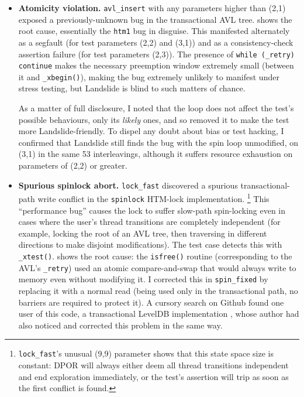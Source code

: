 \begin{itemize}
	\item
	{\bf Atomicity violation.}
	{\tt avl\_insert} with any parameters higher than (2,1)
	exposed a previously-unknown bug in the transactional AVL tree.
	 shows the root cause, essentially the {\tt htm1} bug in disguise.
	This manifested
	alternately
	as a segfault (for test parameters (2,2) and (3,1))
	and
	as a consistency-check assertion failure (for test parameters (2,3)).
	The presence of {\tt while (\_retry) continue} makes the necessary preemption window extremely small
	(between it and {\tt \_xbegin()}),
	making the bug extremely unlikely to manifest under stress testing,
	but Landslide is blind to such matters of chance.

	As a matter of full disclosure,
	I noted that the loop does not affect the test's possible behaviours,
	only its {\em likely} ones,
	and so removed it to make the test more Landslide-friendly.
	To dispel any doubt about bias or test hacking,
	I confirmed that Landslide still finds the bug with the spin loop unmodified,
	on (3,1) in the same 53 interleavings,
	although it suffers resource exhaustion
	on parameters of (2,2) or greater.
	\item
	{\bf Spurious spinlock abort.}
	{\tt lock\_fast} discovered a spurious transactional-path write conflict
	in the {\tt spinlock} HTM-lock implementation.%
	\footnote{{\tt lock\_fast}'s unusual (9,9) parameter shows that this state space size is constant: %
	DPOR will always either deem all thread transitions independent and end exploration immediately,
	or the test's assertion will trip as soon as the first conflict is found.}
	This ``performance bug'' causes the lock to suffer slow-path spin-locking
	even in cases where the user's thread transitions are completely independent
	(for example, locking the root of an AVL tree,
	then traversing in different directions to make disjoint modifications).
	The test case detects this with {\tt \_xtest()}.
	 shows the root cause:
	the {\tt isfree()} routine (corresponding to the AVL's {\tt \_retry})
	used an atomic compare-and-swap that would always write to memory even without modifying it.
	I corrected this in
	{\tt spin\_fixed}
	by replacing it
	with a normal read
	(being used only in the transactional path, no barriers are required to protect it).
	A cursory search on Github found one user of this code,
	a transactional LevelDB implementation \cite{htm-leveldb-github},
	whose author had also noticed and corrected this problem in the same way.


\end{itemize}
